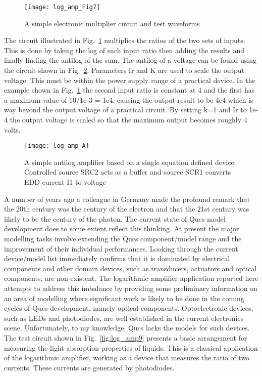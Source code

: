  \begin{figure} [h]
  \centering
  \texttt{[image: log\_amp\_Fig7]}
  \caption{A simple electronic multiplier circuit and test waveforms}
  \label{fig:log_amp7}
\end{figure} 
 
The circuit illustrated in Fig.~\ref{fig:log_amp7} multiplies the
ratios of the two sets of inputs.  This is done by taking the log of
each input ratio then adding the results and finally finding the
antilog of the sum. The antilog of a voltage can be found using the
circuit shown in Fig.~\ref{fig:log_ampA}. Parameters Ir and K are used
to scale the output voltage. This must be within the power supply
range of a practical device. In the example shown in
Fig.~\ref{fig:log_amp7} the second input ratio is constant at 4 and
the first has a maximum value of 10/1e-3 = 1e4, causing the output
result to be 4e4 which is way beyond the output voltage of a practical
circuit. By setting k=1 and Ir to 1e-4 the output voltage is scaled so
that the maximum output becomes roughly 4 volts.

 \begin{figure} [h]
  \centering
  \texttt{[image: log\_amp\_A]}
  \caption{A simple antilog amplifier based on a single equation defined device: Controlled source SRC2 acts as a buffer and source SCR1 converts EDD current I1 to voltage}
  \label{fig:log_ampA}
\end{figure} 


A number of years ago a colleague in Germany made the profound remark
that the 20th century was the century of the electron and that the
21st century was likely to be the century of the photon.  The current
state of Qucs model development does to some extent reflect this
thinking.  At present the major modelling tasks involve extending the
Qucs component/model range and the improvement of their individual
performances. Looking through the current device/model list
immediately confirms that it is dominated by electrical components and
other domain devices, such as transducers, actuators and optical
components, are non-existent. The logarithmic amplifier application
reported here attempts to address this imbalance by providing some
preliminary information on an area of modelling where significant work
is likely to be done in the coming cycles of Qucs development, namely
optical components. Optoelectronic devices, such as LEDs and
photodiodes, are well established in the current electronics
scene. Unfortunately, to my knowledge, Qucs lacks the models for such
devices. The test circuit shown in Fig.~\ref{fig:log_amp9} presents a
basic arrangement for measuring the light absorption properties of
liquids. This is a classical application of the logarithmic amplifier,
working as a device that measures the ratio of two currents. These
currents are generated by photodiodes.

